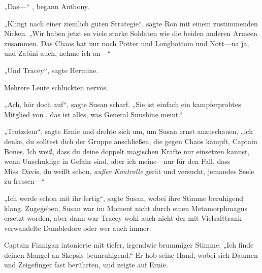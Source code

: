 „Das—“ , begann Anthony.

„Klingt nach einer ziemlich guten Strategie“, sagte Ron mit einem zustimmenden Nicken. „Wir haben jetzt so viele starke Soldaten wie die beiden anderen Armeen zusammen. Das Chaos hat nur noch Potter und Longbottom und Nott—na ja, und Zabini auch, nehme ich an—“

„Und Tracey“, sagte Hermine.

Mehrere Leute schluckten nervös.

„Ach, hör doch auf“, sagte Susan scharf. „Sie ist einfach ein kampferprobtes Mitglied von \SPHEW, das ist alles, was General Sunshine meint.“

„Trotzdem“, sagte Ernie und drehte sich um, um Susan ernst anzuschauen, „ich denke, du solltest dich der Gruppe anschließen, die gegen Chaos kämpft, Captain Bones. Ich weiß, dass du deine doppelt magischen Kräfte nur einsetzen kannst, wenn Unschuldige in Gefahr sind, aber ich meine—nur für den Fall, dass Miss~Davis, du weißt schon, \emph{außer Kontrolle} gerät und versucht, jemandes Seele zu fressen—“

„Ich werde schon mit ihr fertig“, sagte Susan, wobei ihre Stimme beruhigend klang. Zugegeben, Susan war im Moment nicht durch einen Metamorphmagus ersetzt worden, aber dann war Tracey wohl auch nicht der mit Vielsafttrank verwandelte Dumbledore oder wer auch immer.

Captain Finnigan intonierte mit tiefer, irgendwie brummiger Stimme: „Ich finde deinen Mangel an Skepsis beunruhigend.“ Er hob seine Hand, wobei sich Daumen und Zeigefinger fast berührten, und zeigte auf Ernie.

